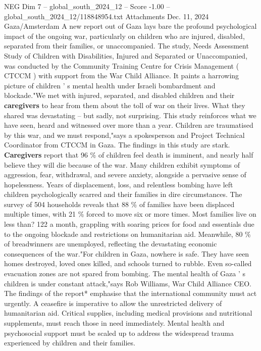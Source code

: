 \begin{textsample}{NEG Dim 7 – global\_south\_2024\_12 – Score -1.00 – global\_south\_2024\_12/118848954.txt}  \label{ex:f7_neg_109}
Attachments Dec. 11, 2024 Gaza/Amsterdam A new report out of Gaza lays bare the profound psychological impact of the ongoing war, particularly on children who are injured, disabled, separated from their families, or unaccompanied.
The study, Needs Assessment Study of Children with Disabilities, Injured and Separated or Unaccompanied, was conducted by the Community Training Centre for Crisis Management ( CTCCM ) with support from the War Child Alliance.
It paints a harrowing picture of children ' s mental health under Israeli bombardment and blockade."We met with injured, separated, and disabled children and their \textbf{caregivers} to hear from them about the toll of war on their lives.
What they shared was devastating -- but sadly, not surprising.
This study reinforces what we have seen, heard and witnessed over more than a year.
Children are traumatised by this war, and we must respond,"says a spokesperson and Project Technical Coordinator from CTCCM in Gaza.
The findings in this study are stark. \textbf{Caregivers} report that 96 \% of children feel death is imminent, and nearly half believe they will die because of the war.
Many children exhibit symptoms of aggression, fear, withdrawal, and severe anxiety, alongside a pervasive sense of hopelessness.
Years of displacement, loss, and relentless bombing have left children psychologically scarred and their families in dire circumstances.
The survey of 504 households reveals that 88 \% of families have been displaced multiple times, with 21 \% forced to move six or more times.
Most families live on less than? 122 a month, grappling with soaring prices for food and essentials due to the ongoing blockade and restrictions on humanitarian aid.
Meanwhile, 80 \% of breadwinners are unemployed, reflecting the devastating economic consequences of the war."For children in Gaza, nowhere is safe.
They have seen homes destroyed, loved ones killed, and schools turned to rubble.
Even so-called evacuation zones are not spared from bombing.
The mental health of Gaza ' s children is under constant attack,"says Rob Williams, War Child Alliance CEO.
The findings of the report* emphasise that the international community must act urgently.
A ceasefire is imperative to allow the unrestricted delivery of humanitarian aid.
Critical supplies, including medical provisions and nutritional supplements, must reach those in need immediately.
Mental health and psychosocial support must be scaled up to address the widespread trauma experienced by children and their families.

\end{textsample}

